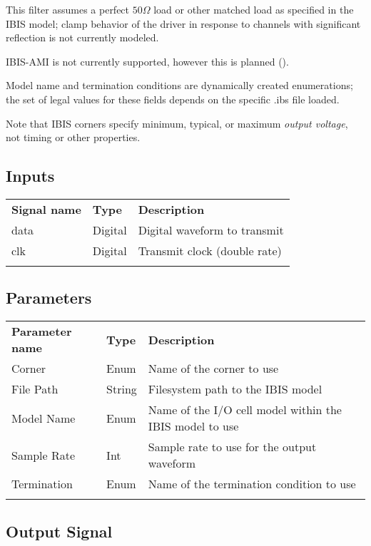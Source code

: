 This filter assumes a perfect $50\Omega$ load or other matched load as specified in the IBIS model; clamp behavior of
the driver in response to channels with significant reflection is not currently modeled.

IBIS-AMI is not currently supported, however this is planned ().

Model name and termination conditions are dynamically created enumerations; the set of legal values for these fields
depends on the specific .ibs file loaded.

Note that IBIS corners specify minimum, typical, or maximum \emph{output voltage}, not timing or other properties.

\subsection{Inputs}

\begin{tabularx}{16cm}{llX}
\thickhline
\textbf{Signal name} & \textbf{Type} & \textbf{Description} \\
\thickhline
data & Digital & Digital waveform to transmit\\
\thinhline
clk & Digital & Transmit clock (double rate)\\
\thickhline
\end{tabularx}

\subsection{Parameters}

\begin{tabularx}{16cm}{llX}
\thickhline
\textbf{Parameter name} & \textbf{Type} & \textbf{Description} \\
\thickhline
Corner & Enum & Name of the corner to use\\
\thinhline
File Path & String & Filesystem path to the IBIS model\\
\thinhline
Model Name & Enum & Name of the I/O cell model within the IBIS model to use\\
\thinhline
Sample Rate & Int & Sample rate to use for the output waveform\\
\thinhline
Termination & Enum & Name of the termination condition to use\\
\thickhline
\end{tabularx}

\subsection{Output Signal}

